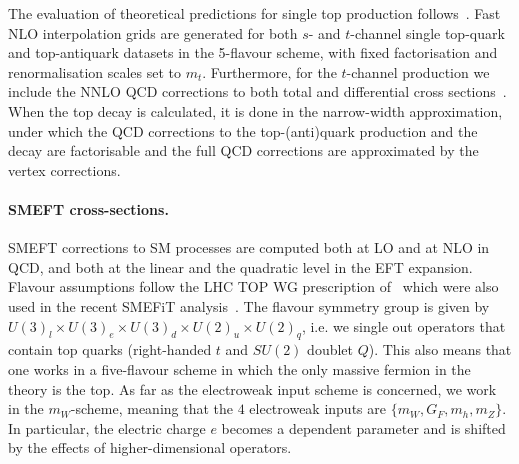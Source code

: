\documentclass[withindex,glossary]{cam-thesis}
\begin{document}
The evaluation of theoretical predictions for single top production follows~\cite{Nocera:2019wyk}.
%
Fast NLO interpolation grids are generated for both  $s$- and $t$-channel
single top-quark and top-antiquark datasets in the 5-flavour scheme,  with fixed
factorisation and renormalisation scales set to $m_t$.
%
Furthermore, 
for the $t$-channel production we include the NNLO QCD corrections to
both total and differential cross sections~\cite{Berger:2017zof}.
%
When the top decay is calculated, it is done in the narrow-width approximation, under which the QCD corrections to the top-(anti)quark production
and the decay are factorisable and the full QCD corrections are approximated by the vertex corrections.

\paragraph{SMEFT cross-sections.}
%
SMEFT corrections to SM processes are computed both at LO and at NLO in QCD, 
and both at the linear and the quadratic level in the EFT expansion.
%
Flavour assumptions follow the LHC TOP WG prescription of~\cite{Aguilar-Saavedra:2018ksv}
which were also used in the recent {\sc\small SMEFiT} analysis~\cite{Ethier:2021bye}.
%
The flavour symmetry group is
given by $U(3)_l \times U(3)_e \times U(3)_d \times U(2)_u \times U(2)_q$, i.e. we single out operators that contain
top quarks (right-handed $t$ and $SU(2)$ doublet $Q$).
%
This also means that one works in a five-flavour scheme in which the
only massive fermion in the theory is the top.
%
As far as the electroweak input scheme is concerned, we work in the $m_W$-scheme, meaning that the $4$
electroweak inputs are
$\{m_W, G_F, m_h, m_Z\}$. In particular, the electric charge $e$ becomes a dependent parameter and is shifted by 
the effects of higher-dimensional operators.
\end{document}
